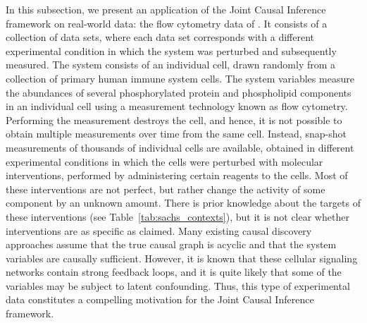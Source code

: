\documentclass[twoside,11pt]{article}
\begin{document}
In this subsection, we present an application of the Joint Causal Inference framework on 
real-world data: the flow cytometry data of \citet{SPP05}. 
It consists of a collection of data sets, where each data set corresponds with a different experimental condition in which the system was perturbed and subsequently measured. 
The system consists of an individual cell, drawn randomly from a collection of primary human immune system cells.
The system variables measure the abundances of several phosphorylated protein and phospholipid components in an individual cell using a measurement technology known as flow cytometry.
Performing the measurement destroys the cell, and hence, it is not possible to obtain multiple measurements over time from the same cell. 
Instead, snap-shot measurements of thousands of individual cells are available, obtained in different experimental conditions in which the cells were perturbed with molecular interventions, performed by administering certain reagents to the cells.
Most of these interventions are not perfect, but rather change the activity of some component by an unknown amount.
There is prior knowledge about the targets of these interventions (see Table~\ref{tab:sachs_contexts}), but it is not clear whether interventions are as specific as claimed.
Many existing causal discovery approaches assume that the true causal graph is acyclic and that the system variables are causally sufficient. 
However, it is known that these cellular signaling networks contain strong feedback loops, and it is quite likely that some of the variables may be subject to latent confounding.
Thus, this type of experimental data constitutes a compelling motivation for the Joint Causal Inference framework.
\end{document}
